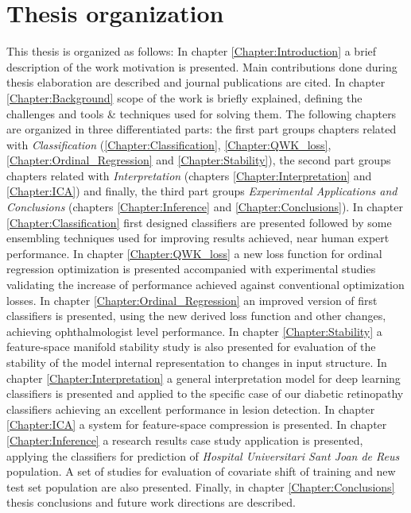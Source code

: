 \section{Thesis organization}

This thesis is organized as follows: In chapter \ref{Chapter:Introduction} a brief description of the work motivation is presented. Main contributions done during thesis elaboration are described and journal publications are cited. In chapter \ref{Chapter:Background} scope of the work is briefly explained, defining the challenges and tools \& techniques used for solving them. The following chapters are organized in three differentiated parts: the first part groups chapters related with \emph{Classification} (\ref{Chapter:Classification}, \ref{Chapter:QWK_loss}, \ref{Chapter:Ordinal_Regression} and \ref{Chapter:Stability}), the second part groups chapters related with \emph{Interpretation} (chapters \ref{Chapter:Interpretation} and \ref{Chapter:ICA}) and finally, the third part groups \emph{Experimental Applications and Conclusions} (chapters  \ref{Chapter:Inference} and \ref{Chapter:Conclusions}). In chapter \ref{Chapter:Classification} first designed classifiers are presented followed by some ensembling techniques used for improving results achieved, near human expert performance. In chapter \ref{Chapter:QWK_loss} a new loss function for ordinal regression optimization is presented accompanied with experimental studies validating the increase of performance achieved against conventional optimization losses. In chapter \ref{Chapter:Ordinal_Regression} an improved version of first classifiers is presented, using the new derived loss function and other changes, achieving ophthalmologist level performance. In chapter \ref{Chapter:Stability} a feature-space manifold stability study is also presented for evaluation of the stability of the model internal representation to changes in input structure. In chapter \ref{Chapter:Interpretation} a general interpretation model for deep learning classifiers is presented and applied to the specific case of our diabetic retinopathy classifiers achieving an excellent performance in lesion detection. In chapter \ref{Chapter:ICA} a system for feature-space compression is presented. In chapter \ref{Chapter:Inference} a research results case study application is presented, applying the classifiers for prediction of \emph{Hospital Universitari Sant Joan de Reus} population. A set of studies for evaluation of covariate shift of training and new test set population are also presented. Finally, in chapter \ref{Chapter:Conclusions} thesis conclusions and future work directions are described.

